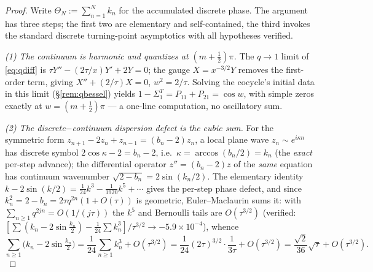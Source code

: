 \begin{proof}
Write $\Theta_N:=\sum_{n=1}^N k_n$ for the accumulated discrete phase. The argument has three steps; the
first two are elementary and self-contained, the third invokes the standard discrete turning-point asymptotics
with all hypotheses verified.

\emph{(1) The continuum is harmonic and quantizes at $(m+\tfrac12)\pi$.} The $q\to1$ limit of
\eqref{eq:qdiff} is $\tau Y''-(2\tau/x)Y'+2Y=0$; the gauge $X=x^{-3/2}Y$ removes the first-order term, giving
$X''+(2/\tau)X=0$, $w^2=2/\tau$. Solving the cocycle's initial data in this limit (\S\ref{rem:qbessel}) yields
$1-\Sigma_1^T=P_{11}+P_{21}=\cos w$, with simple zeros exactly at $w=(m+\tfrac12)\pi$ --- a one-line
computation, no oscillatory sum.

\emph{(2) The discrete$-$continuum dispersion defect is the cubic sum.} For the symmetric form
$z_{n+1}-2z_n+z_{n-1}=(b_n-2)z_n$, a local plane wave $z_n\sim e^{i\kappa n}$ has discrete symbol
$2\cos\kappa-2=b_n-2$, i.e.\ $\kappa=\arccos(b_n/2)=k_n$ (the \emph{exact} per-step advance); the differential
operator $z''=(b_n-2)z$ of the \emph{same} equation has continuum wavenumber $\sqrt{2-b_n}=2\sin(k_n/2)$. The
elementary identity $k-2\sin(k/2)=\tfrac1{24}k^3-\tfrac1{1920}k^5+\cdots$ gives the per-step phase defect, and
since $k_n^2=2-b_n=2\tau q^{2n}(1+O(\tau))$ is geometric, Euler--Maclaurin sums it: with
$\sum_{n\ge1}q^{2jn}=O(1/(j\tau))$ the $k^5$ and Bernoulli tails are $O(\tau^{3/2})$ \textup(verified:\
$[\sum(k_n-2\sin\tfrac{k_n}2)-\tfrac1{24}\sum k_n^3]/\tau^{3/2}\to-5.9\times10^{-4}$\textup), whence
\begin{equation}\label{eq:defectsum}
  \sum_{n\ge1}\bigl(k_n-2\sin\tfrac{k_n}2\bigr)=\frac1{24}\sum_{n\ge1}k_n^3+O(\tau^{3/2})
  =\frac1{24}(2\tau)^{3/2}\!\cdot\!\frac1{3\tau}+O(\tau^{3/2})=\frac{\sqrt2}{36}\sqrt\tau+O(\tau^{3/2}).
\end{equation}


\end{proof}
